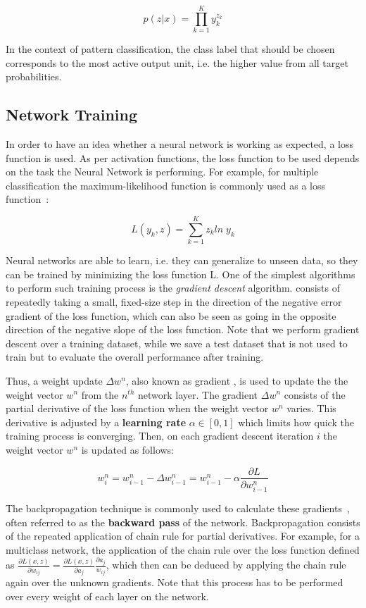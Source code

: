 \[
    p(z|x) = \prod_{k=1}^K y_k^{z_k}
\]

In the context of pattern classification, the class label that should be chosen corresponds to 
the most active output unit, i.e. the higher value from all target probabilities.

\subsection{Network Training}
In order to have an idea whether a neural network is working as expected, a loss function is 
used. As per activation functions, the loss function to be used depends on the task the Neural 
Network is performing.  For example, for multiple classification the maximum-likelihood function 
is commonly used as a loss function~\cite{appendix:bishop1995neural}:

\[
    L(y_k, z) = \sum_{k=1}^K z_k ln \; y_k
\]

Neural networks are able to learn, i.e. they can generalize to unseen data, so they can be 
trained by minimizing the loss function L. One of the simplest algorithms to perform such 
training process is the \textit{gradient descent} algorithm.  consists 
of repeatedly taking a small, fixed-size step in the direction of the negative error gradient 
of the loss function, which can also be seen as going in the opposite direction of the 
negative slope of the loss function. Note that we perform gradient descent over a training 
dataset, while we save a test dataset that is not used to train but to evaluate the overall 
performance after training.

Thus, a weight update $\Delta w^n$, also known as gradient , is used to update the the weight 
vector $w^n$ from the $n^{th}$ network layer. The gradient $\Delta w^n$ consists of the 
partial derivative of the loss function when the weight vector $w^n$ varies. This derivative 
is adjusted by a \textbf{learning rate} $\alpha \in [0, 1]$ which limits how quick the training process 
is converging. Then, on each gradient descent iteration $i$ the weight vector $w^n$ is updated as 
follows:

\[
    w_{i}^n = w_{i-1}^n - \Delta w_{i-1}^n = w_{i-1}^n - \alpha \frac{\partial L}{\partial w_{i-1}^n}
\]

The backpropagation technique is commonly used to calculate these 
gradients~\cite{appendix:rumelhart1985learning, appendix:williams1995gradient, appendix:werbos1988generalization}, 
often referred to as the \textbf{backward pass} of the network. Backpropagation consists of 
the repeated application of chain rule for partial derivatives. For example, for a multiclass 
network, the application of the chain rule over the loss function defined as 
$\frac{\partial L(x, z)}{\partial w_{ij}} = \frac{\partial L(x, z)}{\partial a_j} \frac{\partial a_j}{w_{ij}}$, 
which then can be deduced by applying the chain rule again over the unknown gradients. 
Note that this process has to be performed over every weight of each layer on the network.

